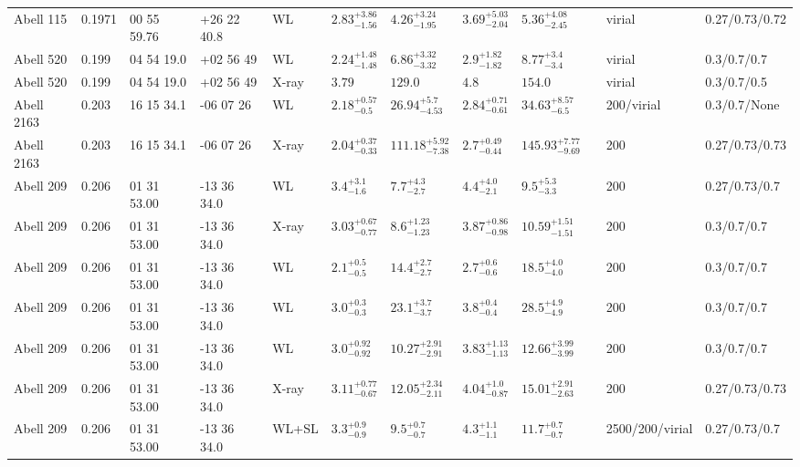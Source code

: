 \begin{landscape}
\begin{center}
{\begin{longtable}{llllllllllll}
Abell 115 & 0.1971 & 00 55 59.76 & +26 22 40.8 & WL & ${2.83}^{+3.86}_{-1.56}$ & ${4.26}^{+3.24}_{-1.95}$ & ${3.69}^{+5.03}_{-2.04}$ & ${5.36}^{+4.08}_{-2.45}$ & \citet{OK10.1} & virial & 0.27/0.73/0.72 \\
Abell 520 & 0.199 & 04 54 19.0 & +02 56 49 & WL & ${2.24}^{+1.48}_{-1.48}$ & ${6.86}^{+3.32}_{-3.32}$ & ${2.9}^{+1.82}_{-1.82}$ & ${8.77}^{+3.4}_{-3.4}$ & \citet{OK08.1} & virial & 0.3/0.7/0.7 \\
Abell 520 & 0.199 & 04 54 19.0 & +02 56 49 & X-ray & ${3.79}^{}_{}$ & ${129.0}^{}_{}$ & ${4.8}^{}_{}$ & ${154.0}^{}_{}$ & \citet{MO99.1} & virial & 0.3/0.7/0.5 \\
Abell 2163 & 0.203 & 16 15 34.1 & -06 07 26 & WL & ${2.18}^{+0.57}_{-0.5}$ & ${26.94}^{+5.7}_{-4.53}$ & ${2.84}^{+0.71}_{-0.61}$ & ${34.63}^{+8.57}_{-6.5}$ & \citet{OK11.1} & 200/virial & 0.3/0.7/None \\
Abell 2163 & 0.203 & 16 15 34.1 & -06 07 26 & X-ray & ${2.04}^{+0.37}_{-0.33}$ & ${111.18}^{+5.92}_{-7.38}$ & ${2.7}^{+0.49}_{-0.44}$ & ${145.93}^{+7.77}_{-9.69}$ & \citet{BA14.1} & 200 & 0.27/0.73/0.73 \\
Abell 209 & 0.206 & 01 31 53.00 & -13 36 34.0 & WL & ${3.4}^{+3.1}_{-1.6}$ & ${7.7}^{+4.3}_{-2.7}$ & ${4.4}^{+4.0}_{-2.1}$ & ${9.5}^{+5.3}_{-3.3}$ & \citet{PA07.1} & 200 & 0.27/0.73/0.7 \\
Abell 209 & 0.206 & 01 31 53.00 & -13 36 34.0 & X-ray & ${3.03}^{+0.67}_{-0.77}$ & ${8.6}^{+1.23}_{-1.23}$ & ${3.87}^{+0.86}_{-0.98}$ & ${10.59}^{+1.51}_{-1.51}$ & \citet{ET11.1} & 200 & 0.3/0.7/0.7 \\
Abell 209 & 0.206 & 01 31 53.00 & -13 36 34.0 & WL & ${2.1}^{+0.5}_{-0.5}$ & ${14.4}^{+2.7}_{-2.7}$ & ${2.7}^{+0.6}_{-0.6}$ & ${18.5}^{+4.0}_{-4.0}$ & \citet{SE14.1} & 200 & 0.3/0.7/0.7 \\
Abell 209 & 0.206 & 01 31 53.00 & -13 36 34.0 & WL & ${3.0}^{+0.3}_{-0.3}$ & ${23.1}^{+3.7}_{-3.7}$ & ${3.8}^{+0.4}_{-0.4}$ & ${28.5}^{+4.9}_{-4.9}$ & \citet{SE14.1} & 200 & 0.3/0.7/0.7 \\
Abell 209 & 0.206 & 01 31 53.00 & -13 36 34.0 & WL & ${3.0}^{+0.92}_{-0.92}$ & ${10.27}^{+2.91}_{-2.91}$ & ${3.83}^{+1.13}_{-1.13}$ & ${12.66}^{+3.99}_{-3.99}$ & \citet{BA07.1} & 200 & 0.3/0.7/0.7 \\
Abell 209 & 0.206 & 01 31 53.00 & -13 36 34.0 & X-ray & ${3.11}^{+0.77}_{-0.67}$ & ${12.05}^{+2.34}_{-2.11}$ & ${4.04}^{+1.0}_{-0.87}$ & ${15.01}^{+2.91}_{-2.63}$ & \citet{BA14.1} & 200 & 0.27/0.73/0.73 \\
Abell 209 & 0.206 & 01 31 53.00 & -13 36 34.0 & WL+SL & ${3.3}^{+0.9}_{-0.9}$ & ${9.5}^{+0.7}_{-0.7}$ & ${4.3}^{+1.1}_{-1.1}$ & ${11.7}^{+0.7}_{-0.7}$ & \citet{ME14.1} & 2500/200/virial & 0.27/0.73/0.7 \\

\end{longtable}}
\end{center}
\end{landscape}
